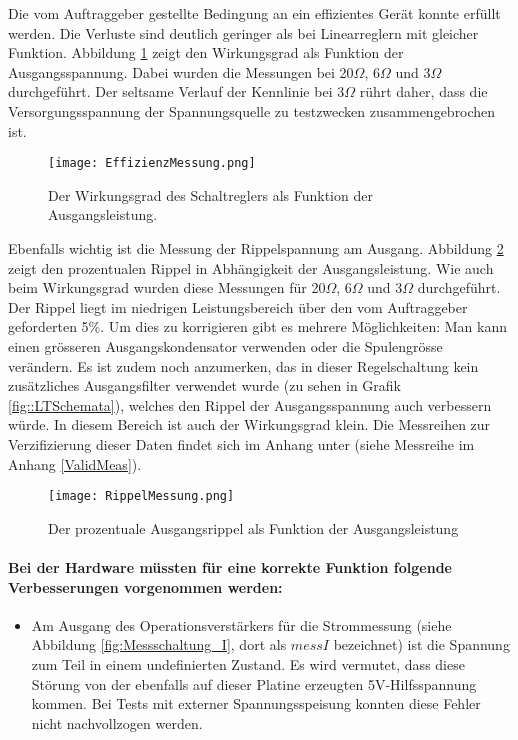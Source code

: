 Die vom Auftraggeber gestellte Bedingung an ein effizientes Gerät konnte erfüllt werden. Die Verluste sind deutlich geringer als bei Linearreglern mit gleicher Funktion. Abbildung \ref{fig:Wirkungsgrad} zeigt den Wirkungsgrad als Funktion der Ausgangsspannung. Dabei wurden die Messungen bei 20$\Omega$, 6$\Omega$ und 3$\Omega$ durchgeführt. Der seltsame Verlauf der Kennlinie bei 3$\Omega$ rührt daher, dass die Versorgungsspannung der Spannungsquelle zu testzwecken zusammengebrochen ist.

\begin{figure}[h]
	\centering
		\texttt{[image: EffizienzMessung.png]}
	\caption{Der Wirkungsgrad des Schaltreglers als Funktion der Ausgangsleistung.}
	\label{fig:Wirkungsgrad}
\end{figure}

Ebenfalls wichtig ist die Messung der Rippelspannung am Ausgang. Abbildung \ref{fig:RippelMessung} zeigt den prozentualen Rippel in Abhängigkeit der Ausgangsleistung. Wie auch beim Wirkungsgrad wurden diese Messungen für 20$\Omega$, 6$\Omega$ und 3$\Omega$ durchgeführt. \\
Der Rippel liegt im niedrigen Leistungsbereich über den vom Auftraggeber geforderten 5\%. Um dies zu korrigieren gibt es mehrere Möglichkeiten: Man kann einen grösseren Ausgangskondensator verwenden oder die Spulengrösse verändern. Es ist zudem noch anzumerken, das in dieser Regelschaltung kein zusätzliches Ausgangsfilter verwendet wurde (zu sehen in Grafik \ref{fig::LTSchemata}), welches den Rippel der Ausgangsspannung auch verbessern würde. In diesem Bereich ist auch der Wirkungsgrad klein. Die Messreihen zur Verzifizierung dieser Daten findet sich im Anhang unter (siehe Messreihe im Anhang \ref{ValidMeas}).

\begin{figure}[h]
	\centering
		\texttt{[image: RippelMessung.png]}
	\caption{Der prozentuale Ausgangsrippel als Funktion der Ausgangsleistung}
	\label{fig:RippelMessung}
\end{figure}


\paragraph{Bei der Hardware müssten für eine korrekte Funktion folgende Verbesserungen vorgenommen werden:}
\begin{itemize}
	\item Am Ausgang des Operationsverstärkers für die Strommessung (siehe Abbildung \ref{fig:Messschaltung_I}, dort als $messI$ bezeichnet) ist die Spannung zum Teil in einem undefinierten Zustand. Es wird vermutet, dass diese Störung von der ebenfalls auf dieser Platine erzeugten 5V-Hilfsspannung kommen. Bei Tests mit externer Spannungsspeisung konnten diese Fehler nicht nachvollzogen werden.
\end{itemize}
